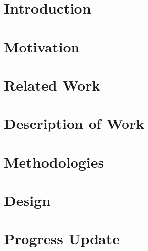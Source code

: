 \documentclass[12pt, doubleside, a4paper]{report}
\begin{document}
\maketitle




\tableofcontents
\pagebreak

\section{Introduction}


\section{Motivation}


\section{Related Work}


\section{Description of Work}


\section{Methodologies}


\section{Design}


\section{Progress Update}



\begin{thebibliography}{0}
\end{thebibliography}
\end{document}
